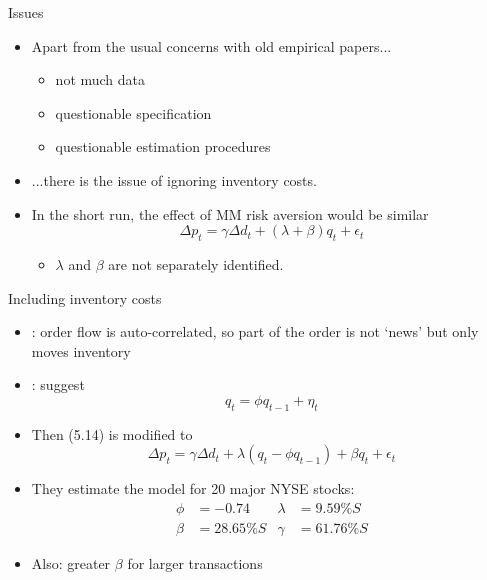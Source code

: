 \documentclass[english,10pt
,aspectratio=169
]{beamer}
\begin{document}
\begin{frame}{Issues}
	\begin{itemize}
		\item Apart from the usual concerns with old empirical papers...
		\begin{itemize}
			\item not much data
			\item questionable specification
			\item questionable estimation procedures
		\end{itemize}
		\item ...there is the issue of ignoring inventory costs.
		\item In the short run, the effect of MM risk aversion would be similar
		\begin{equation} \tag{5.14}
		\Delta p_t = \gamma \Delta d_t + (\lambda + \beta) q_t + \epsilon_t
		\end{equation}
		\begin{itemize}
			\item $\lambda$ and $\beta$ are not separately identified.
		\end{itemize}
	\end{itemize}
\end{frame}


\begin{frame}[label=extending]{Including inventory costs}
	\begin{itemize}
		\item \textbf{\cite{hasbrouck_trades_1988}}: order flow is auto-correlated, so part of the order is not `news' but only moves inventory
		\item \textbf{\cite{huang_components_1997}}: suggest
		\begin{equation}\tag{5.17}
		q_t = \phi q_{t-1} + \eta_t
		\end{equation}
		\item Then (5.14) is modified to \hyperlink{derivation}{}
		\begin{equation} \tag{5.21}
		\Delta p_t = \gamma \Delta d_t + \lambda (q_t - \phi q_{t-1}) + \beta q_t + \epsilon_t
		\end{equation}
		\item They estimate the model for 20 major NYSE stocks: 
		\begin{align*}
			\phi &= -0.74	& \lambda &= 9.59\% S
			\\
			\beta &= 28.65\% S	& \gamma &= 61.76\% S
		\end{align*}
		\item Also: greater $\beta$ for larger transactions
	\end{itemize}
\end{frame}
\end{document}
